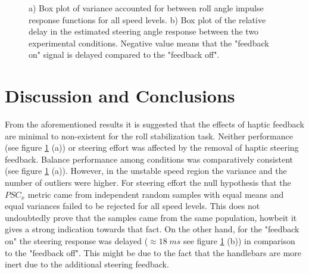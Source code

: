 \begin{figure}[h]
    \caption{ a) Box plot of variance accounted for between roll angle impulse response functions for all speed levels. b) Box plot of the relative delay in the estimated steering angle response  between the two experimental conditions. Negative value means that the "feedback on" signal is delayed compared to the "feedback off".}
    \label{fig:BoxPlots}
\end{figure}

\section{Discussion and Conclusions}

From the aforementioned results it is suggested  that the effects of haptic feedback are minimal to non-existent for the roll stabilization task. Neither performance (see figure \ref{fig:BoxPlots} (a)) or steering effort was affected by the removal of haptic steering feedback. Balance performance among conditions was comparatively consistent  (see figure \ref{fig:BoxPlots} (a)). However, in the unstable speed region the variance and the number of outliers were higher. For steering effort the null hypothesis that the $\mathit{PSC}_x$ metric came from independent random samples with equal means and equal variances failed to be rejected for all speed levels. This does not undoubtedly prove that the samples came from the same population, howbeit it gives a strong indication towards that fact. On the other hand, for the "feedback on"  the steering response was delayed (\(\approx 18\; \si{ms}\) see figure \ref{fig:BoxPlots} (b)) in comparison to the "feedback off". This might be due to the fact that the handlebars are more inert due to the additional steering feedback. 

